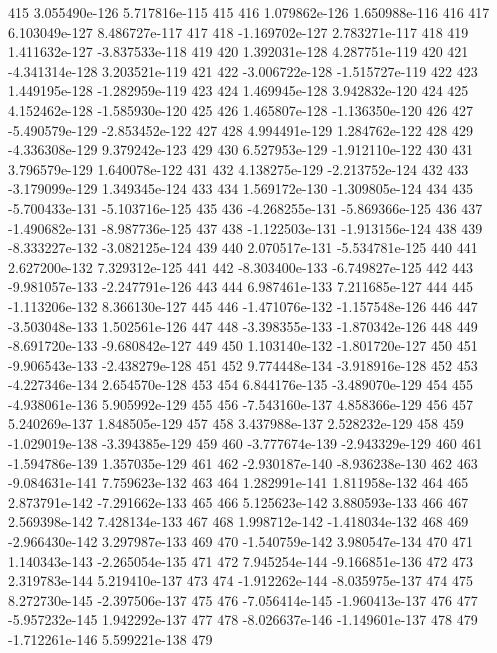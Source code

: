 \documentclass{article}
\begin{document}
\begin{Schunk}
\begin{Soutput}
415   3.055490e-126  5.717816e-115  415
416   1.079862e-126  1.650988e-116  416
417   6.103049e-127  8.486727e-117  417
418  -1.169702e-127  2.783271e-117  418
419   1.411632e-127 -3.837533e-118  419
420   1.392031e-128  4.287751e-119  420
421  -4.341314e-128  3.203521e-119  421
422  -3.006722e-128 -1.515727e-119  422
423   1.449195e-128 -1.282959e-119  423
424   1.469945e-128  3.942832e-120  424
425   4.152462e-128 -1.585930e-120  425
426   1.465807e-128 -1.136350e-120  426
427  -5.490579e-129 -2.853452e-122  427
428   4.994491e-129  1.284762e-122  428
429  -4.336308e-129  9.379242e-123  429
430   6.527953e-129 -1.912110e-122  430
431   3.796579e-129  1.640078e-122  431
432   4.138275e-129 -2.213752e-124  432
433  -3.179099e-129  1.349345e-124  433
434   1.569172e-130 -1.309805e-124  434
435  -5.700433e-131 -5.103716e-125  435
436  -4.268255e-131 -5.869366e-125  436
437  -1.490682e-131 -8.987736e-125  437
438  -1.122503e-131 -1.913156e-124  438
439  -8.333227e-132 -3.082125e-124  439
440   2.070517e-131 -5.534781e-125  440
441   2.627200e-132  7.329312e-125  441
442  -8.303400e-133 -6.749827e-125  442
443  -9.981057e-133 -2.247791e-126  443
444   6.987461e-133  7.211685e-127  444
445  -1.113206e-132  8.366130e-127  445
446  -1.471076e-132 -1.157548e-126  446
447  -3.503048e-133  1.502561e-126  447
448  -3.398355e-133 -1.870342e-126  448
449  -8.691720e-133 -9.680842e-127  449
450   1.103140e-132 -1.801720e-127  450
451  -9.906543e-133 -2.438279e-128  451
452   9.774448e-134 -3.918916e-128  452
453  -4.227346e-134  2.654570e-128  453
454   6.844176e-135 -3.489070e-129  454
455  -4.938061e-136  5.905992e-129  455
456  -7.543160e-137  4.858366e-129  456
457   5.240269e-137  1.848505e-129  457
458   3.437988e-137  2.528232e-129  458
459  -1.029019e-138 -3.394385e-129  459
460  -3.777674e-139 -2.943329e-129  460
461  -1.594786e-139  1.357035e-129  461
462  -2.930187e-140 -8.936238e-130  462
463  -9.084631e-141  7.759623e-132  463
464   1.282991e-141  1.811958e-132  464
465   2.873791e-142 -7.291662e-133  465
466   5.125623e-142  3.880593e-133  466
467   2.569398e-142  7.428134e-133  467
468   1.998712e-142 -1.418034e-132  468
469  -2.966430e-142  3.297987e-133  469
470  -1.540759e-142  3.980547e-134  470
471   1.140343e-143 -2.265054e-135  471
472   7.945254e-144 -9.166851e-136  472
473   2.319783e-144  5.219410e-137  473
474  -1.912262e-144 -8.035975e-137  474
475   8.272730e-145 -2.397506e-137  475
476  -7.056414e-145 -1.960413e-137  476
477  -5.957232e-145  1.942292e-137  477
478  -8.026637e-146 -1.149601e-137  478
479  -1.712261e-146  5.599221e-138  479

\end{Soutput}
\end{Schunk}
\end{document}
